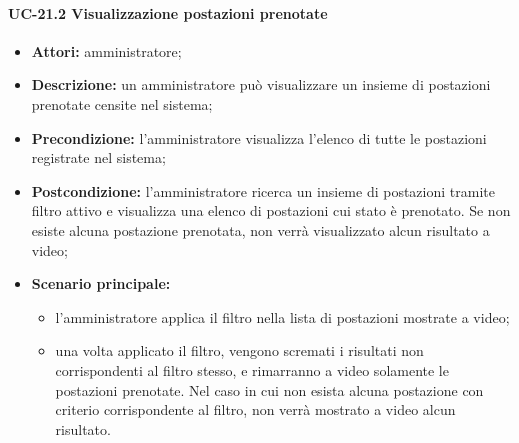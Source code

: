 \paragraph{UC-21.2 Visualizzazione postazioni prenotate}
\begin{itemize}
    \item \textbf{Attori:} amministratore;
    \item \textbf{Descrizione:} un amministratore pu\`{o} visualizzare un insieme di postazioni prenotate censite nel sistema;
    \item \textbf{Precondizione:} l'amministratore visualizza l'elenco di tutte le postazioni registrate nel sistema;
    \item \textbf{Postcondizione:} l'amministratore ricerca un insieme di postazioni tramite filtro attivo e visualizza una elenco di postazioni cui stato è prenotato. Se non esiste alcuna postazione prenotata, non verrà visualizzato alcun risultato a video;
    \item \textbf{Scenario principale:}
    \begin{itemize}
        \item l'amministratore applica il filtro nella lista di postazioni mostrate a video;
        \item una volta applicato il filtro, vengono scremati i risultati non corrispondenti al filtro stesso, e rimarranno a video solamente le postazioni prenotate. Nel caso in cui non esista alcuna postazione con criterio corrispondente al filtro, non verrà mostrato a video alcun risultato.
    \end{itemize}
\end{itemize}

